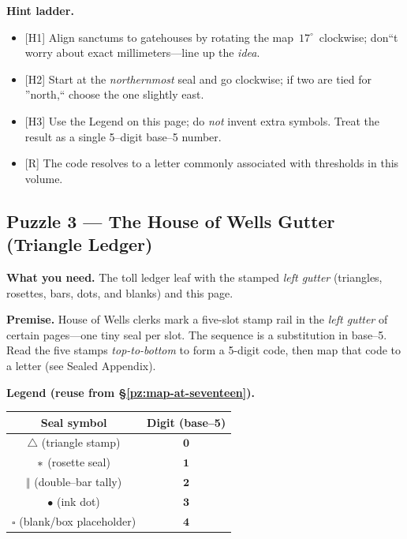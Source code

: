 \documentclass[11pt]{article}
\numberwithin{equation}{section} %
\theoremstyle{plain} %
\theoremstyle{definition} %
\theoremstyle{remark} %
\begin{document}
\medskip
\noindent\textbf{Hint ladder.}
\begin{itemize}\setlength\itemsep{0.25em}
  \item \textsc{[H1]} Align sanctums to gatehouses by rotating the map \(\,17^\circ\,\) clockwise; don``t worry about exact millimeters---line up the \emph{idea}.
  \item \textsc{[H2]} Start at the \emph{northernmost} seal and go clockwise; if two are tied for ''north,`` choose the one slightly east.
  \item \textsc{[H3]} Use the Legend on this page; do \emph{not} invent extra symbols. Treat the result as a single 5--digit base--5 number.
  \item \textsc{[R]} The code resolves to a letter commonly associated with thresholds in this volume.
\end{itemize}

\subsection{Puzzle 3 --- The House of Wells Gutter (Triangle Ledger)}
\label{pz:triangle-ledger}

\noindent\textbf{What you need.} The toll ledger leaf with the stamped \emph{left gutter} (triangles, rosettes, bars, dots, and blanks) and this page.

\medskip
\noindent\textbf{Premise.} House of Wells clerks mark a five-slot stamp rail in the \emph{left gutter} of certain pages---one tiny seal per slot. The sequence is a substitution in base--5. Read the five stamps \emph{top-to-bottom} to form a 5-digit code, then map that code to a letter (see Sealed Appendix).

\medskip
\noindent\textbf{Legend (reuse from \S\ref{pz:map-at-seventeen}).}
\begin{center}
\begin{tabular}{c|c}
\textbf{Seal symbol} & \textbf{Digit (base--5)} \\
\hline
\(\triangle\) (triangle stamp) & \(\mathbf{0}\) \\
\(\large\ast\) (rosette seal) & \(\mathbf{1}\) \\
\(\Vert\) (double--bar tally) & \(\mathbf{2}\) \\
\(\bullet\) (ink dot) & \(\mathbf{3}\) \\
\(\square\) (blank/box placeholder) & \(\mathbf{4}\) \\
\end{tabular}
\end{center}
\end{document}
